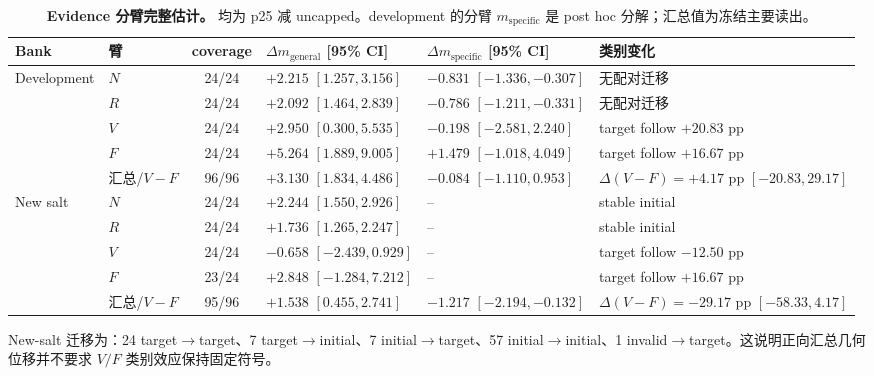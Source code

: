 \documentclass[UTF8,letterpaper,10pt,twocolumn]{ctexart}
\begin{document}
\begin{table}[t]
\centering
\small
\begin{tabular}{llcL{3.15cm}L{3.15cm}L{3.8cm}}
\toprule
Bank & 臂 & coverage & $\Delta m_{\mathrm{general}}$ [95\% CI] & $\Delta m_{\mathrm{specific}}$ [95\% CI] & 类别变化 \\
\midrule
Development & $N$ & 24/24 & $+2.215$ $[1.257,3.156]$ & $-0.831$ $[-1.336,-0.307]$ & 无配对迁移 \\
& $R$ & 24/24 & $+2.092$ $[1.464,2.839]$ & $-0.786$ $[-1.211,-0.331]$ & 无配对迁移 \\
& $V$ & 24/24 & $+2.950$ $[0.300,5.535]$ & $-0.198$ $[-2.581,2.240]$ & target follow $+20.83$ pp \\
& $F$ & 24/24 & $+5.264$ $[1.889,9.005]$ & $+1.479$ $[-1.018,4.049]$ & target follow $+16.67$ pp \\
& 汇总/$V-F$ & 96/96 & $+3.130$ $[1.834,4.486]$ & $-0.084$ $[-1.110,0.953]$ & $\Delta(V-F)=+4.17$ pp $[-20.83,29.17]$ \\
\midrule
New salt & $N$ & 24/24 & $+2.244$ $[1.550,2.926]$ & -- & stable initial \\
& $R$ & 24/24 & $+1.736$ $[1.265,2.247]$ & -- & stable initial \\
& $V$ & 24/24 & $-0.658$ $[-2.439,0.929]$ & -- & target follow $-12.50$ pp \\
& $F$ & 23/24 & $+2.848$ $[-1.284,7.212]$ & -- & target follow $+16.67$ pp \\
& 汇总/$V-F$ & 95/96 & $+1.538$ $[0.455,2.741]$ & $-1.217$ $[-2.194,-0.132]$ & $\Delta(V-F)=-29.17$ pp $[-58.33,4.17]$ \\
\bottomrule
\end{tabular}
\caption{\textbf{Evidence 分臂完整估计。} 均为 p25 减 uncapped。development 的分臂 $m_{\mathrm{specific}}$ 是 post hoc 分解；汇总值为冻结主要读出。}
\label{tab:supp-evidence-zh}
\end{table}

New-salt 迁移为：24 target$\rightarrow$target、7 target$\rightarrow$initial、7 initial$\rightarrow$target、57 initial$\rightarrow$initial、1 invalid$\rightarrow$target。这说明正向汇总几何位移并不要求 $V/F$ 类别效应保持固定符号。
\end{document}
